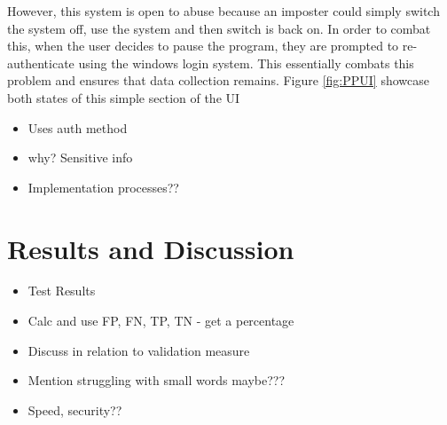 \documentclass[10pt,a4paper]{report}
\begin{document}
However, this system is open to abuse because an imposter could simply switch the system off, use the system and then switch is back on. In order to combat this, when the user decides to pause the program, they are prompted to re-authenticate using the windows login system. This essentially combats this problem and ensures that data collection remains. Figure \ref{fig:PPUI} showcase both states of this simple section of the UI



\begin{itemize}
	\item Uses auth method
	\item why? Sensitive info
	\item Implementation processes??
\end{itemize}
\chapter{Results and Discussion}
\begin{itemize}
	\item Test Results
	\item Calc and use FP, FN, TP, TN - get a percentage
	\item Discuss in relation to validation measure
	\item Mention struggling with small words maybe???
	\item Speed, security??
\end{itemize}
\end{document}
